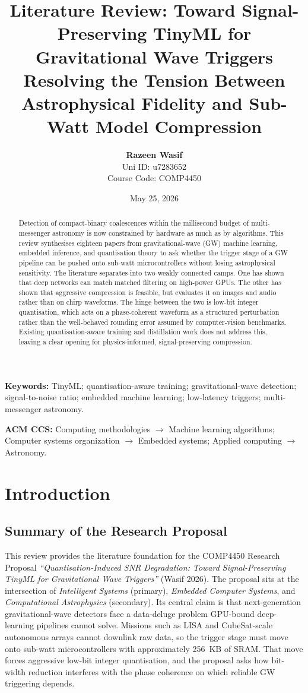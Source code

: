 \documentclass[11pt,a4paper]{article}
\title{\textbf{Literature Review: Toward Signal-Preserving TinyML for Gravitational Wave Triggers} \\
\large Resolving the Tension Between Astrophysical Fidelity and Sub-Watt Model Compression}
\author{\textbf{Razeen Wasif} \\ Uni ID: u7283652 \\ Course Code: COMP4450}
\date{May 25, 2026}
\begin{document}
\maketitle

\begin{abstract}
Detection of compact-binary coalescences within the millisecond budget of multi-messenger astronomy is now constrained by hardware as much as by algorithms. This review synthesises eighteen papers from gravitational-wave (GW) machine learning, embedded inference, and quantisation theory to ask whether the trigger stage of a GW pipeline can be pushed onto sub-watt microcontrollers without losing astrophysical sensitivity. The literature separates into two weakly connected camps. One has shown that deep networks can match matched filtering on high-power GPUs. The other has shown that aggressive compression is feasible, but evaluates it on images and audio rather than on chirp waveforms. The hinge between the two is low-bit integer quantisation, which acts on a phase-coherent waveform as a structured perturbation rather than the well-behaved rounding error assumed by computer-vision benchmarks. Existing quantisation-aware training and distillation work does not address this, leaving a clear opening for physics-informed, signal-preserving compression.
\end{abstract}

\noindent\textbf{Keywords:} TinyML; quantisation-aware training; gravitational-wave detection; signal-to-noise ratio; embedded machine learning; low-latency triggers; multi-messenger astronomy.

\smallskip
\noindent\textbf{ACM CCS:} Computing methodologies $\rightarrow$ Machine learning algorithms; Computer systems organization $\rightarrow$ Embedded systems; Applied computing $\rightarrow$ Astronomy.

\section{Introduction}

\subsection{Summary of the Research Proposal}
This review provides the literature foundation for the COMP4450 Research Proposal \textit{``Quantisation-Induced SNR Degradation: Toward Signal-Preserving TinyML for Gravitational Wave Triggers''} (Wasif 2026). The proposal sits at the intersection of \textit{Intelligent Systems} (primary), \textit{Embedded Computer Systems}, and \textit{Computational Astrophysics} (secondary). Its central claim is that next-generation gravitational-wave detectors face a data-deluge problem GPU-bound deep-learning pipelines cannot solve. Missions such as LISA and CubeSat-scale autonomous arrays cannot downlink raw data, so the trigger stage must move onto sub-watt microcontrollers with approximately 256~KB of SRAM. That move forces aggressive low-bit integer quantisation, and the proposal asks how bit-width reduction interferes with the phase coherence on which reliable GW triggering depends.
\end{document}
